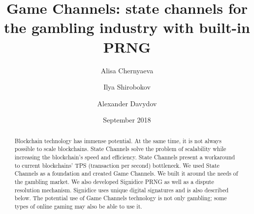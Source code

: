 \documentclass[tikz, 12pt]{article}
\title {Game Channels: state channels for the gambling industry with built-in PRNG}
\author {Alisa Chernyaeva}
\author{Ilya Shirobokov}
\author{Alexander Davydov}
\affil{Research department, DAO.Casino Company}
\affil{ \href{mailto:research@dao.casino}{research@dao.casino}}
\date {September 2018}
\theoremstyle{definition}
\theoremstyle{remark}
\begin{document}
\maketitle
	\begin{abstract}
Blockchain technology has immense potential. At the same time, it is not always possible to scale blockchains. State Channels solve the problem of scalability while increasing the blockchain's speed and efficiency. State Channels present a workaround to current blockchains' TPS (transaction per second) bottleneck. We used State Channels as a foundation and created Game Channels. We built it around the needs of the gambling market. We also developed Signidice PRNG as well as a dispute resolution mechanism. Signidice uses unique digital signatures and is also described below. The potential use of Game Channels technology is not only gambling; some types of online gaming may also be able to use it.

	\end{abstract}
\tableofcontents	
	
	
		

\end{document}
